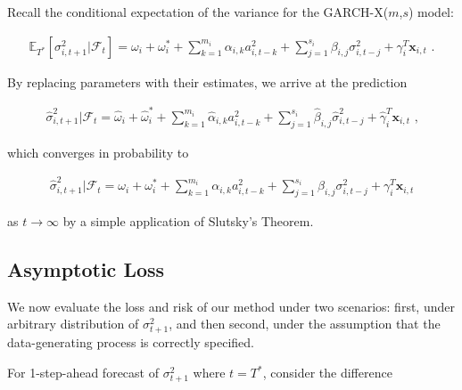 \documentclass[11pt,3p,review,authoryear]{elsarticle}
\newcommand{\x}{\textbf{x}}
\def\E{\mathbb{E}} %
\theoremstyle{definition}
\newenvironment{proof-of-proposition}[1][{}]{\noindent{\bf
    Proof of Proposition {#1}}
  \hspace*{.5em}}{\qed\bigskip\\}
\begin{document}
\begin{proof-of-proposition}
Recall the conditional expectation of the variance for the GARCH-X($m$,$s$) model:

\begin{align*}
\E_{T^{*}}[\sigma^{2}_{i,t+1}|\mathcal{F}_{t}] = \omega_{i} + \omega^{*}_i + \sum^{m_{i}}_{k=1}\alpha_{i,k}a^{2}_{i,t-k} + \sum_{j=1}^{s_{i}}\beta_{i,j}\sigma_{i,t-j}^{2} + \gamma_{i}^{T} \x_{i,t} \text{ .}
\end{align*}

By replacing parameters with their estimates, we arrive at the prediction 

\begin{align*}
\hat\sigma^{2}_{i,t+1}|\mathcal{F}_{t} = \hat\omega_{i} + \hat\omega^{*}_i + \sum^{m_{i}}_{k=1}\hat\alpha_{i,k}a^{2}_{i,t-k} + \sum_{j=1}^{s_{i}}\hat\beta_{i,j}\hat\sigma_{i,t-j}^{2} + \hat\gamma_{i}^{T} \x_{i,t} \text { ,}
\end{align*}

which converges in probability to 

\begin{align*}
  \hat\sigma^{2}_{i,t+1}|\mathcal{F}_{t} = \omega_{i} + \omega^{*}_i + \sum^{m_{i}}_{k=1}\alpha_{i,k}a^{2}_{i,t-k} + \sum_{j=1}^{s_{i}}\beta_{i,j}\sigma_{i,t-j}^{2} + \gamma_{i}^{T} \x_{i,t}
  \end{align*}

as $t\rightarrow\infty$ by a simple application of Slutsky's Theorem.

\end{proof-of-proposition}

\subsection{Asymptotic Loss}

We now evaluate the loss and risk of our method under two scenarios: first, under arbitrary distribution of $\sigma^{2}_{t+1}$, and then second, under the assumption that the data-generating process is correctly specified.

For 1-step-ahead forecast of $\sigma^{2}_{t+1}$ where $t=T^{*}$, consider the difference 
\end{document}

